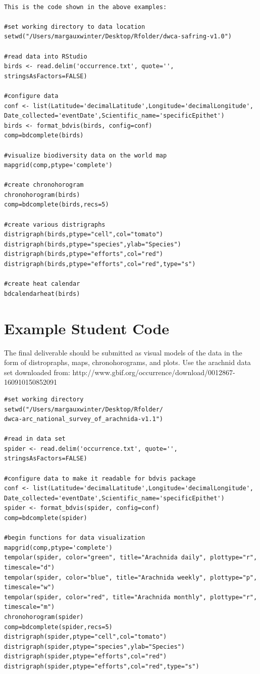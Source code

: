 \begin{lstlisting}

This is the code shown in the above examples:

#set working directory to data location
setwd("/Users/margauxwinter/Desktop/Rfolder/dwca-safring-v1.0")

#read data into RStudio
birds <- read.delim('occurrence.txt', quote='', stringsAsFactors=FALSE)

#configure data
conf <- list(Latitude='decimalLatitude',Longitude='decimalLongitude',
Date_collected='eventDate',Scientific_name='specificEpithet')
birds <- format_bdvis(birds, config=conf)
comp=bdcomplete(birds)

#visualize biodiversity data on the world map
mapgrid(comp,ptype='complete')

#create chronohorogram
chronohorogram(birds) 
comp=bdcomplete(birds,recs=5)

#create various distrigraphs
distrigraph(birds,ptype="cell",col="tomato") 
distrigraph(birds,ptype="species",ylab="Species") 
distrigraph(birds,ptype="efforts",col="red") 
distrigraph(birds,ptype="efforts",col="red",type="s") 

#create heat calendar
bdcalendarheat(birds) 
\end{lstlisting}

\section{Example Student Code}

The final deliverable should be submitted as visual models of the data in the form of distropraphs, maps, chronohorograms, and plots. Use the arachnid data set downloaded from: http://www.gbif.org/occurrence/download/0012867-160910150852091

\begin{lstlisting}
#set working directory
setwd("/Users/margauxwinter/Desktop/Rfolder/
dwca-arc_national_survey_of_arachnida-v1.1")

#read in data set
spider <- read.delim('occurrence.txt', quote='', stringsAsFactors=FALSE)

#configure data to make it readable for bdvis package
conf <- list(Latitude='decimalLatitude',Longitude='decimalLongitude',
Date_collected='eventDate',Scientific_name='specificEpithet')
spider <- format_bdvis(spider, config=conf)
comp=bdcomplete(spider)

#begin functions for data visualization
mapgrid(comp,ptype='complete')
tempolar(spider, color="green", title="Arachnida daily", plottype="r", timescale="d") 
tempolar(spider, color="blue", title="Arachnida weekly", plottype="p", timescale="w") 
tempolar(spider, color="red", title="Arachnida monthly", plottype="r", timescale="m") 
chronohorogram(spider) 
comp=bdcomplete(spider,recs=5)
distrigraph(spider,ptype="cell",col="tomato") 
distrigraph(spider,ptype="species",ylab="Species") 
distrigraph(spider,ptype="efforts",col="red") 
distrigraph(spider,ptype="efforts",col="red",type="s") 
\end{lstlisting}
